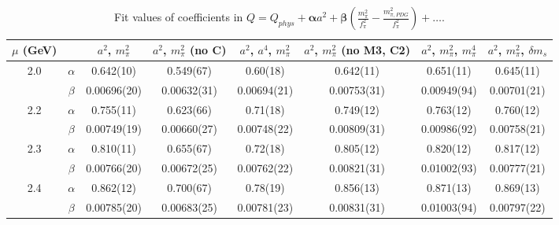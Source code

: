 \documentclass[12pt]{extarticle}
\begin{document}
\begin{table}[h!]
\begin{center}
\begin{tabular}{|c c|c|c|c|c|c|c|}
\hline
$\mu$ (GeV) &  & $a^2$, $m_\pi^2$& $a^2$, $m_\pi^2$ (no C)& $a^2$, $a^4$, $m_\pi^2$& $a^2$, $m_\pi^2$ (no M3, C2)& $a^2$, $m_\pi^2$, $m_\pi^4$& $a^2$, $m_\pi^2$, $\delta m_s$\\
\hline
\multirow{2}{0.5in}{2.0} & $\alpha$ & 0.642(10)& 0.549(67)& 0.60(18)& 0.642(11)& 0.651(11)& 0.645(11)\\
 & $\beta$ & 0.00696(20)& 0.00632(31)& 0.00694(21)& 0.00753(31)& 0.00949(94)& 0.00701(21)\\
\hline
\multirow{2}{0.5in}{2.2} & $\alpha$ & 0.755(11)& 0.623(66)& 0.71(18)& 0.749(12)& 0.763(12)& 0.760(12)\\
 & $\beta$ & 0.00749(19)& 0.00660(27)& 0.00748(22)& 0.00809(31)& 0.00986(92)& 0.00758(21)\\
\hline
\multirow{2}{0.5in}{2.3} & $\alpha$ & 0.810(11)& 0.655(67)& 0.72(18)& 0.805(12)& 0.820(12)& 0.817(12)\\
 & $\beta$ & 0.00766(20)& 0.00672(25)& 0.00762(22)& 0.00821(31)& 0.01002(93)& 0.00777(21)\\
\hline
\multirow{2}{0.5in}{2.4} & $\alpha$ & 0.862(12)& 0.700(67)& 0.78(19)& 0.856(13)& 0.871(13)& 0.869(13)\\
 & $\beta$ & 0.00785(20)& 0.00683(25)& 0.00781(23)& 0.00831(31)& 0.01003(94)& 0.00797(22)\\
\hline
\end{tabular}
\caption{Fit values of coefficients in $Q = Q_{phys} + \mathbf{\alpha} a^2 + \mathbf{\beta}\left(\frac{m_\pi^2}{f_\pi^2}-\frac{m_{\pi,PDG}^2}{f_\pi^2}\right) + \ldots$.}
\end{center}
\end{table}
























\clearpage
\end{document}
